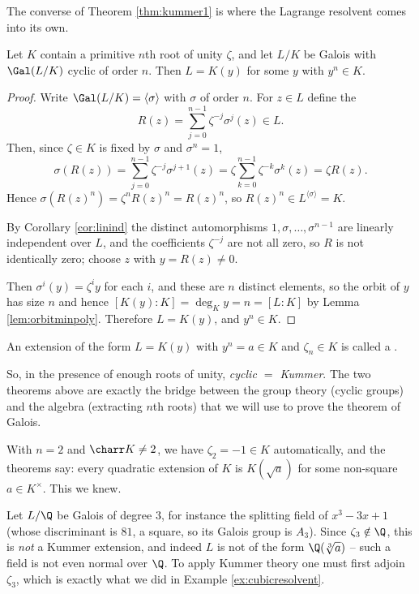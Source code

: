 The converse of Theorem \ref{thm:kummer1} is where the Lagrange resolvent comes into its own.

\begin{theorem}\label{thm:kummer2}
	Let $K$ contain a primitive $n$th root of unity $\zeta$, and let $L/K$ be Galois with $\Gal(L/K)$ cyclic of order $n$. Then $L = K(y)$ for some $y$ with $y^n \in K$.
\end{theorem}

\begin{proof}
	Write $\Gal(L/K) = \langle\sigma\rangle$ with $\sigma$ of order $n$. For $z \in L$ define the 
	$$R(z) = \sum_{j=0}^{n-1}\zeta^{-j}\sigma^j(z) \in L.$$
	Then, since $\zeta \in K$ is fixed by $\sigma$ and $\sigma^n = 1$,
	$$\sigma(R(z)) = \sum_{j=0}^{n-1}\zeta^{-j}\sigma^{j+1}(z) = \zeta\sum_{k=0}^{n-1}\zeta^{-k}\sigma^k(z) = \zeta R(z).$$
	Hence $\sigma(R(z)^n) = \zeta^n R(z)^n = R(z)^n$, so $R(z)^n \in L^{\langle\sigma\rangle} = K$.

	By Corollary \ref{cor:linind} the distinct automorphisms $1, \sigma, \dots, \sigma^{n-1}$ are linearly independent over $L$, and the coefficients $\zeta^{-j}$ are not all zero, so $R$ is not identically zero; choose $z$ with $y = R(z) \neq 0$.

	Then $\sigma^i(y) = \zeta^i y$ for each $i$, and these are $n$ distinct elements, so the orbit of $y$ has size $n$ and hence $[K(y):K] = \deg_K y = n = [L:K]$ by Lemma \ref{lem:orbitminpoly}. Therefore $L = K(y)$, and $y^n \in K$.
\end{proof}

\begin{definition}
	An extension of the form $L = K(y)$ with $y^n = a \in K$ and $\zeta_n \in K$ is called a .
\end{definition}

So, in the presence of enough roots of unity, \emph{cyclic $=$ Kummer}. The two theorems above are exactly the bridge between the group theory (cyclic groups) and the algebra (extracting $n$th roots) that we will use to prove the theorem of Galois.

\begin{example}
	With $n=2$ and $\charr K \neq 2$, we have $\zeta_2 = -1 \in K$ automatically, and the theorems say: every quadratic extension of $K$ is $K(\sqrt a)$ for some non-square $a \in K^\times$. This we knew.
\end{example}

\begin{example}
	Let $L/\Q$ be Galois of degree $3$, for instance the splitting field of $x^3-3x+1$ (whose discriminant is $81$, a square, so its Galois group is $A_3$). Since $\zeta_3 \notin \Q$, this is \emph{not} a Kummer extension, and indeed $L$ is not of the form $\Q(\sqrt[3]{a})$ -- such a field is not even normal over $\Q$. To apply Kummer theory one must first adjoin $\zeta_3$, which is exactly what we did in Example \ref{ex:cubicresolvent}.
\end{example}

